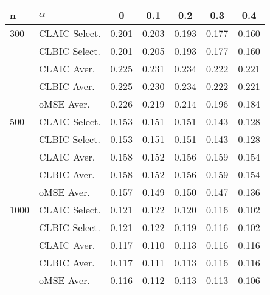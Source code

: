 \begin{tabular} 
 {l l |  *{5}{c} } 
n & $\alpha$ & 0  &  0.1 & 0.2 & 0.3 & 0.4 \\ \hline \hline 
300 & CLAIC Select.& 0.201 &0.203 &0.193 &0.177 &0.160  \\ 
& CLBIC Select. & 0.201 &0.205 &0.193 &0.177 &0.160  \\ \hline 
 & CLAIC Aver.& 0.225 &0.231 &0.234 &0.222 &0.221   \\ 
 & CLBIC Aver. & 0.225 &0.230 &0.234 &0.222 &0.221  \\ 
 & oMSE Aver.& 0.226 &0.219 &0.214 &0.196 &0.184 \\ \hline \hline 
500 & CLAIC Select.& 0.153 &0.151 &0.151 &0.143 &0.128  \\ 
& CLBIC Select. & 0.153 &0.151 &0.151 &0.143 &0.128 \\ \hline 
 & CLAIC Aver.& 0.158 &0.152 &0.156 &0.159 &0.154  \\ 
 & CLBIC Aver. & 0.158 &0.152 &0.156 &0.159 &0.154  \\ 
 & oMSE Aver.& 0.157 &0.149 &0.150 &0.147 &0.136  \\ \hline \hline 
1000 & CLAIC Select.& 0.121 &0.122 &0.120 &0.116 &0.102  \\ 
& CLBIC Select. & 0.121 &0.122 &0.119 &0.116 &0.102  \\ \hline 
 & CLAIC Aver.& 0.117 &0.110 &0.113 &0.116 &0.116   \\ 
 & CLBIC Aver. & 0.117 &0.111 &0.113 &0.116 &0.116  \\ 
 & oMSE Aver.& 0.116 &0.112 &0.113 &0.113 &0.106  \\ \hline 
\hline 
 \end{tabular} 
